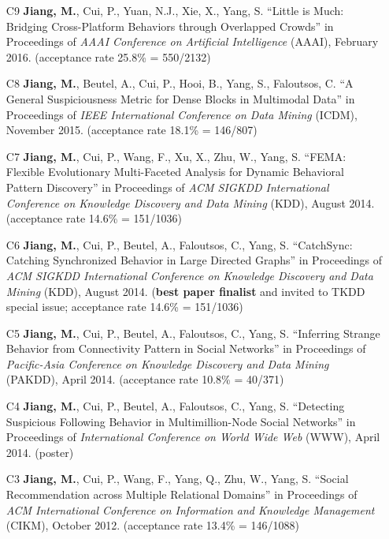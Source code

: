 \documentclass[10pt]{article}
\newenvironment{myindentpar}[1]%
{\begin{list}{}%
         {\setlength{\leftmargin}{#1}}%
         \item[]%
}
{\end{list}}
\newcounter{list}
\begin{document}
\begin{myindentpar}{0.00cm}
\begin{enumerate}[leftmargin=.5cm]
\item[C9] \textbf{Jiang, M.}, Cui, P., Yuan, N.J., Xie, X., Yang, S. ``Little is Much: Bridging Cross-Platform Behaviors through Overlapped Crowds'' in Proceedings of \textit{AAAI Conference on Artificial Intelligence} (AAAI), February 2016. (acceptance rate 25.8\% = 550/2132)

\item[C8] \textbf{Jiang, M.}, Beutel, A., Cui, P., Hooi, B., Yang, S., Faloutsos, C. ``A General Suspiciousness Metric for Dense Blocks in Multimodal Data'' in Proceedings of \textit{IEEE International Conference on Data Mining} (ICDM), November 2015. (acceptance rate 18.1\% = 146/807)

\item[C7] \textbf{Jiang, M.}, Cui, P., Wang, F., Xu, X., Zhu, W., Yang, S. ``FEMA: Flexible Evolutionary Multi-Faceted Analysis for Dynamic Behavioral Pattern Discovery'' in Proceedings of \textit{ACM SIGKDD International Conference on Knowledge Discovery and Data Mining} (KDD), August 2014. (acceptance rate 14.6\% = 151/1036)

\item[C6] \textbf{Jiang, M.}, Cui, P., Beutel, A., Faloutsos, C., Yang, S. ``CatchSync: Catching Synchronized Behavior in Large Directed Graphs'' in Proceedings of \textit{ACM SIGKDD International Conference on Knowledge Discovery and Data Mining} (KDD), August 2014. (\textbf{best paper finalist} and invited to TKDD special issue; acceptance rate 14.6\% = 151/1036)
	
\item[C5] \textbf{Jiang, M.}, Cui, P., Beutel, A., Faloutsos, C., Yang, S. ``Inferring Strange Behavior from Connectivity Pattern in Social Networks'' in Proceedings of \textit{Pacific-Asia Conference on Knowledge Discovery and Data Mining} (PAKDD), April 2014. (acceptance rate 10.8\% = 40/371)

\item[C4] \textbf{Jiang, M.}, Cui, P., Beutel, A., Faloutsos, C., Yang, S. ``Detecting Suspicious Following Behavior in Multimillion-Node Social Networks'' in Proceedings of \textit{International Conference on World Wide Web} (WWW), April 2014. (poster)

\item[C3] \textbf{Jiang, M.}, Cui, P., Wang, F., Yang, Q., Zhu, W., Yang, S. ``Social Recommendation across Multiple Relational Domains'' in Proceedings of \textit{ACM International Conference on Information and Knowledge Management} (CIKM), October 2012. (acceptance rate 13.4\% = 146/1088)


\end{enumerate}
\end{myindentpar}
\end{document}
